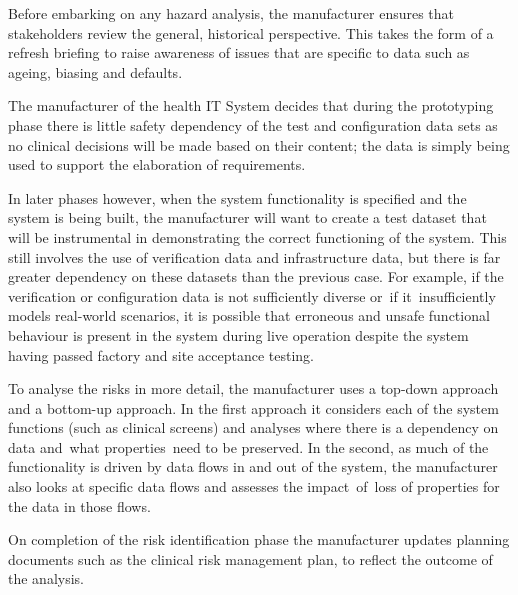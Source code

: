 Before embarking on any hazard analysis, the manufacturer ensures that \glspl{stakeholder} review the general, historical perspective. This takes the form of a refresh briefing to raise awareness of issues that are specific to data such as ageing, biasing and defaults.

The manufacturer of the health IT System decides that during the prototyping phase there is little safety dependency of the test and \gls{configuration data} sets as no clinical decisions will be made based on their content; the data is simply being used to support the elaboration of requirements.

In later phases however, when the system functionality is specified and the system is being built, the manufacturer will want to create a test \gls{dataset} that will be instrumental in demonstrating the correct functioning of the system. This still involves the use of \gls{verification} data and infrastructure data, but there is far greater dependency on these \glspl{dataset} than the previous case. For example, if the \gls{verification} or \gls{configuration data} is not sufficiently diverse or\cbstart\ if it\cbend\ insufficiently models real-world scenarios, it is possible that erroneous and unsafe functional behaviour is present in the system during live operation despite the system having passed factory and site acceptance testing.

To analyse the risks in more detail, the manufacturer uses a top-down approach and a bottom-up approach. In the first approach it considers each of the system functions (such as clinical screens) and analyses where there is a dependency on data and\cbstart\ what properties\cbend\ need to be preserved. In the second, as much of the functionality is driven by data flows in and out of the system, the manufacturer also looks at specific data flows and assesses the impact\cbstart\ of\cbend\ loss of properties for the data in those flows.

On completion of the risk identification phase the manufacturer updates planning documents such as the clinical risk management plan, to reflect the outcome of the analysis.

